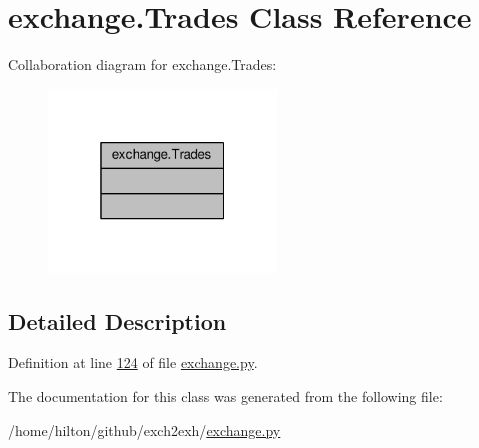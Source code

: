 \hypertarget{classexchange_1_1_trades}{}\section{exchange.\+Trades Class Reference}
\label{classexchange_1_1_trades}


Collaboration diagram for exchange.\+Trades\+:\nopagebreak
\begin{figure}[H]
\begin{center}
\leavevmode
\includegraphics[width=172pt]{classexchange_1_1_trades__coll__graph}
\end{center}
\end{figure}


\subsection{Detailed Description}


Definition at line \hyperlink{exchange_8py_source_l00124}{124} of file \hyperlink{exchange_8py_source}{exchange.\+py}.



The documentation for this class was generated from the following file\+:\begin{DoxyCompactItemize}
\item 
/home/hilton/github/exch2exh/\hyperlink{exchange_8py}{exchange.\+py}\end{DoxyCompactItemize}
